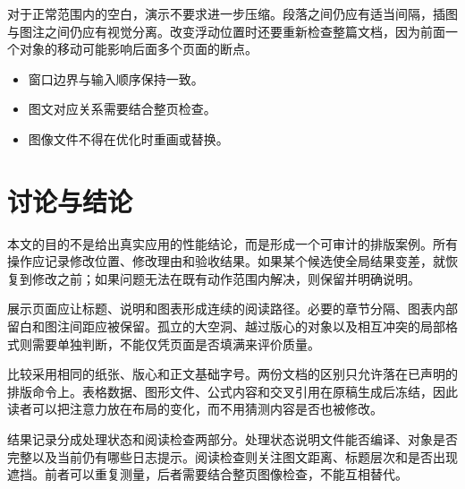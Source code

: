 \documentclass[UTF8,10pt,a4paper,fontset=windows,twocolumn]{ctexart}
\begin{document}
对于正常范围内的空白，演示不要求进一步压缩。段落之间仍应有适当间隔，插图与图注之间仍应有视觉分离。改变浮动位置时还要重新检查整篇文档，因为前面一个对象的移动可能影响后面多个页面的断点。

\begin{itemize}
\item 窗口边界与输入顺序保持一致。
\item 图文对应关系需要结合整页检查。
\item 图像文件不得在优化时重画或替换。
\end{itemize}
\section{讨论与结论}
本文的目的不是给出真实应用的性能结论，而是形成一个可审计的排版案例。所有操作应记录修改位置、修改理由和验收结果。如果某个候选使全局结果变差，就恢复到修改之前；如果问题无法在既有动作范围内解决，则保留并明确说明。

展示页面应让标题、说明和图表形成连续的阅读路径。必要的章节分隔、图表内部留白和图注间距应被保留。孤立的大空洞、越过版心的对象以及相互冲突的局部格式则需要单独判断，不能仅凭页面是否填满来评价质量。

比较采用相同的纸张、版心和正文基础字号。两份文档的区别只允许落在已声明的排版命令上。表格数据、图形文件、公式内容和交叉引用在原稿生成后冻结，因此读者可以把注意力放在布局的变化，而不用猜测内容是否也被修改。

结果记录分成处理状态和阅读检查两部分。处理状态说明文件能否编译、对象是否完整以及当前仍有哪些日志提示。阅读检查则关注图文距离、标题层次和是否出现遮挡。前者可以重复测量，后者需要结合整页图像检查，不能互相替代。
\end{document}

